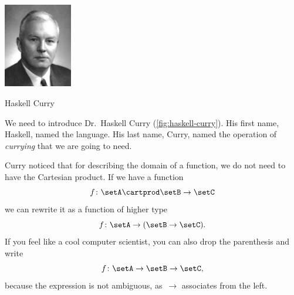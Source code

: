 \begin{marginfigure}
  \includegraphics[width=3cm]{../../../pics/haskell.jpg}
  \caption{Haskell Curry}
  \label{fig:haskell-curry}
\end{marginfigure}

We need to introduce Dr.~Haskell Curry (\cref{fig:haskell-curry}).
His first name,  Haskell, named the language.
His last name, Curry, named the operation of \emph{currying} that we are going to need.

Curry noticed that for describing the domain of a function, we do not need to have the Cartesian product.
If we have a function
\begin{equation}\label{eq:currying-1}
f \colon \setA \cartprod \setB \to \setC
\end{equation}
we can rewrite it as a function of higher type
\begin{equation}\label{eq:currying-2}
f \colon \setA \to ( \setB \to \setC).
\end{equation}
If you feel like a cool computer scientist, you can also drop the parenthesis and write
\begin{equation}\label{eq:currying-3}
f \colon \setA \to \setB \to \setC,
\end{equation}
because the expression is not ambiguous, as~$\to$ associates from the left.




